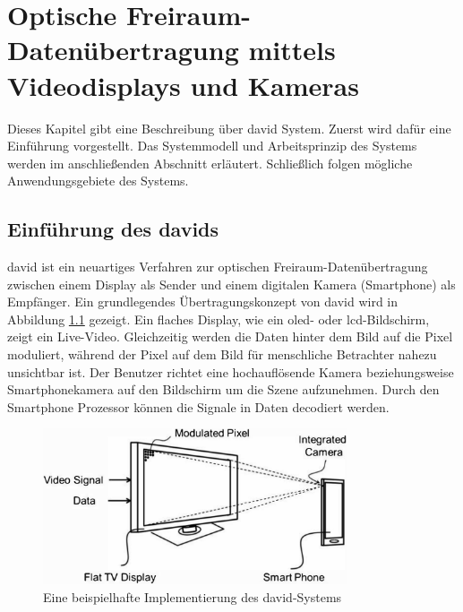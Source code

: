 \chapter{Optische Freiraum-Datenübertragung mittels Videodisplays und Kameras}


Dieses Kapitel gibt eine Beschreibung über \gls{david} System. Zuerst wird dafür eine Einführung vorgestellt. Das Systemmodell und Arbeitsprinzip des Systems werden im anschließenden Abschnitt erläutert. Schließlich folgen mögliche Anwendungsgebiete des Systems. %




\section{Einführung des \gls{david}s} 

\gls{david} \cite{Kays201501} ist ein neuartiges Verfahren zur optischen Freiraum-Datenübertragung zwischen einem Display als Sender und einem digitalen Kamera (Smartphone) als Empfänger. Ein grundlegendes Übertragungskonzept von \gls{david} wird in Abbildung \ref{fig:David1} gezeigt. Ein flaches Display, wie ein \gls{oled}- oder \gls{lcd}-Bildschirm, zeigt ein Live-Video. Gleichzeitig werden die Daten hinter dem Bild auf die Pixel moduliert, während der Pixel auf dem Bild für menschliche Betrachter nahezu unsichtbar ist. Der Benutzer richtet eine hochauflösende Kamera beziehungsweise Smartphonekamera auf den Bildschirm um die Szene aufzunehmen. Durch den Smartphone Prozessor können die Signale  in Daten decodiert werden.

\begin{figure}[htb]
 \centering 
 \includegraphics[keepaspectratio,width=0.8\textwidth]{images/2_DaViD/David1.pdf}
 \caption{Eine beispielhafte Implementierung des \gls{david}-Systems \cite{Kays201502}}
 \label{fig:David1}
\end{figure}


